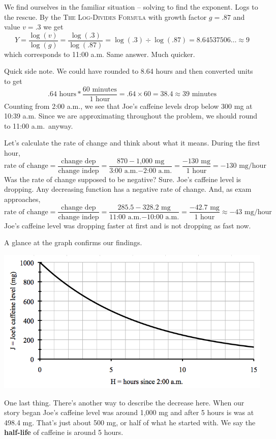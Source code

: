 We find ourselves in the familiar situation -- solving to find the exponent.  Logs to the rescue.  By the
\textsc{The Log-Divides Formula} with growth factor $g=.87$ and value $v= .3$ we get $$Y =  \frac{\log (v)}{\log(g)}=  \frac{\log (.3)}{\log(.87)} =  \log (.3) \div \log (.87) =  8.64537506\ldots \approx 9 $$ 
which corresponds to 11:00 a.m.  Same answer.  Much quicker.

Quick side note.  We could have rounded to 8.64 hours and then converted units to get
$$.64 \text{ hours} \ast \frac{60 \text{ minutes}}{1 \text{ hour}} = .64 \times 60 = 38.4 \approx 39 \text{ minutes}$$
Counting from  2:00 a.m., we see that Joe's caffeine levels drop below 300 mg at 10:39 a.m.  Since we are approximating throughout the problem, we should round to 11:00 a.m.\  anyway.

Let's calculate the rate of change and think about what it means.  During the first hour,
$$\text{rate of change} =  \frac{\text{change dep}}{\text{change indep}} 
= \frac{870-\text{1,000 mg}}{\text{3:00 a.m.} - \text{2:00 a.m.}} = \frac{-130 \text{ mg}}{1 \text{ hour}} = -130 \text{ mg/hour}$$
Was the rate of change supposed to be negative? Sure.  Joe's caffeine level is dropping.  Any decreasing function has a negative rate of change.
And, as exam approaches,
$$\text{rate of change} =  \frac{\text{change dep}}{\text{change indep}}  = \frac{285.5-328.2 \text{ mg}}{\text{11:00 a.m.} - \text{10:00 a.m.}} = \frac{-42.7 \text{ mg}}{1 \text{ hour}} \approx -43 \text{ mg/hour}$$
Joe's caffeine level was dropping faster at first and is not dropping as fast now.  

A glance at the graph confirms our findings.
 \begin{center}
 {\includegraphics [width = 6in] {caffeine.png}}
\end{center}

One last thing.  There's another way to describe the decrease here.  When our story began Joe's caffeine level was around 1,000 mg and after 5 hours is was at 498.4 mg.  That's just about 500 mg, or half of what he started with.  We say the \textbf{half-life} of caffeine is around 5 hours.  

